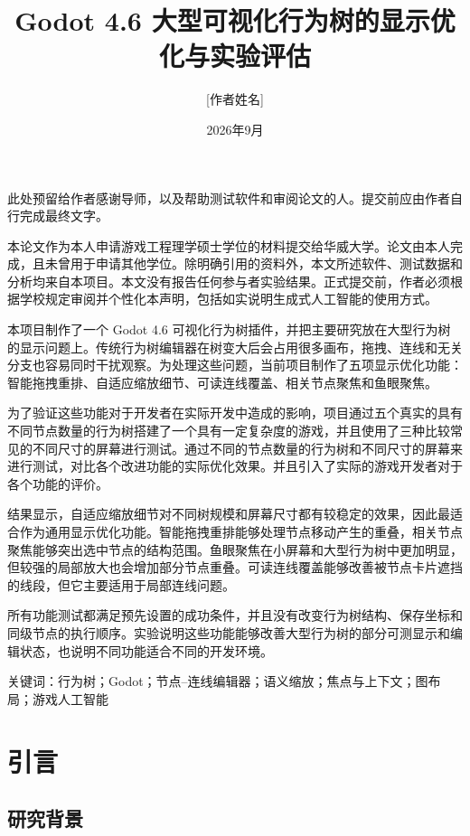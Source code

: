 \documentclass[11pt,a4paper,oneside,extrafontsizes]{memoir}
\title{Godot 4.6 大型可视化行为树的显示优化与实验评估}
\author{[作者姓名]}
\date{2026年9月}
\begin{document}
\frontmatter
{}
\tableofcontents
\clearforchapter\listoffigures
\clearforchapter\listoftables


此处预留给作者感谢导师，以及帮助测试软件和审阅论文的人。提交前应由作者自行完成最终文字。


本论文作为本人申请游戏工程理学硕士学位的材料提交给华威大学。论文由本人完成，且未曾用于申请其他学位。除明确引用的资料外，本文所述软件、测试数据和分析均来自本项目。本文没有报告任何参与者实验结果。正式提交前，作者必须根据学校规定审阅并个性化本声明，包括如实说明生成式人工智能的使用方式。


本项目制作了一个 Godot 4.6 可视化行为树插件，并把主要研究放在大型行为树的显示问题上。传统行为树编辑器在树变大后会占用很多画布，拖拽、连线和无关分支也容易同时干扰观察。为处理这些问题，当前项目制作了五项显示优化功能：智能拖拽重排、自适应缩放细节、可读连线覆盖、相关节点聚焦和鱼眼聚焦。

为了验证这些功能对于开发者在实际开发中造成的影响，项目通过五个真实的具有不同节点数量的行为树搭建了一个具有一定复杂度的游戏，并且使用了三种比较常见的不同尺寸的屏幕进行测试。通过不同的节点数量的行为树和不同尺寸的屏幕来进行测试，对比各个改进功能的实际优化效果。并且引入了实际的游戏开发者对于各个功能的评价。

结果显示，自适应缩放细节对不同树规模和屏幕尺寸都有较稳定的效果，因此最适合作为通用显示优化功能。智能拖拽重排能够处理节点移动产生的重叠，相关节点聚焦能够突出选中节点的结构范围。鱼眼聚焦在小屏幕和大型行为树中更加明显，但较强的局部放大也会增加部分节点重叠。可读连线覆盖能够改善被节点卡片遮挡的线段，但它主要适用于局部连线问题。

所有功能测试都满足预先设置的成功条件，并且没有改变行为树结构、保存坐标和同级节点的执行顺序。实验说明这些功能能够改善大型行为树的部分可测显示和编辑状态，也说明不同功能适合不同的开发环境。

关键词：行为树；Godot；节点–连线编辑器；语义缩放；焦点与上下文；图布局；游戏人工智能

\mainmatter

\chapter{引言}

\section{研究背景}
\end{document}
